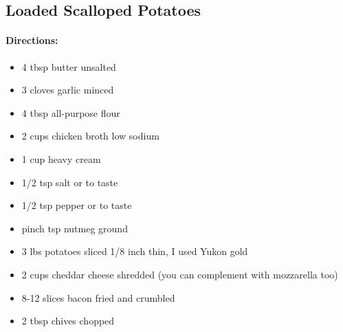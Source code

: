 \documentclass{article}
\begin{document}
\subsection{Loaded Scalloped Potatoes}

\paragraph{Directions:}
\begin{itemize}
\item 4 tbsp butter unsalted
\item 3 cloves garlic minced
\item 4 tbsp all-purpose flour
\item 2 cups chicken broth low sodium
\item 1 cup heavy cream
\item 1/2 tsp salt or to taste
\item 1/2 tsp pepper or to taste
\item pinch tsp nutmeg ground
\item 3 lbs potatoes sliced 1/8 inch thin, I used Yukon gold
\item 2 cups cheddar cheese shredded (you can complement with mozzarella too)
\item 8-12 slices bacon fried and crumbled
\item 2 tbsp chives chopped
\end{itemize}
\end{document}
